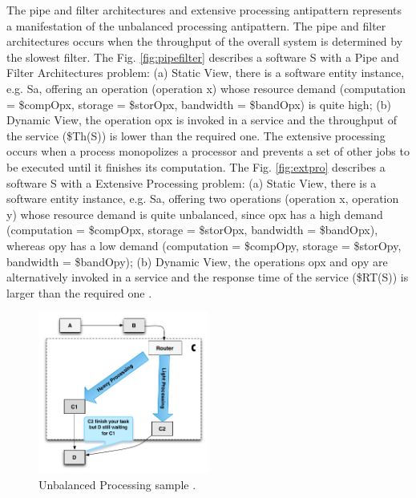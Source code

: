 The pipe and filter architectures  and extensive processing antipattern represents a manifestation of the unbalanced processing antipattern. The pipe and filter architectures occurs when the throughput of the overall system is determined by the slowest filter. The  Fig. \ref{fig:pipefilter} describes a software S with a Pipe and Filter Architectures problem: (a) Static View, there is a software entity instance, e.g. Sa, offering an operation (operation x) whose resource demand (computation = \$compOpx, storage = \$storOpx, bandwidth = \$bandOpx) is quite high; (b) Dynamic View, the operation opx is invoked in a service  and the throughput of the service (\$Th(S)) is lower than the required one. The extensive processing occurs when a process monopolizes a processor and prevents a set of other jobs to be executed until it finishes its computation. The Fig. \ref{fig:extpro} describes a software S with a Extensive Processing problem: (a) Static View, there is a software entity instance, e.g. Sa, offering two operations (operation x, operation y) whose resource demand is quite unbalanced, since opx has a high demand (computation = \$compOpx, storage = \$storOpx, bandwidth = \$bandOpx), whereas opy has a low demand (computation = \$compOpy, storage = \$storOpy, bandwidth = \$bandOpy); (b) Dynamic View, the operations opx and opy are alternatively invoked in a service and the response time of the service (\$RT(S)) is larger than the required one \cite{Vetoio2011}.

\begin{figure}[h]
\centering
\includegraphics[width=0.5\textwidth]{./images/unbalanced.png}
\caption{Unbalanced Processing sample \cite{Wert2013a}. }
\label{fig:unbalanced}
\end{figure}


